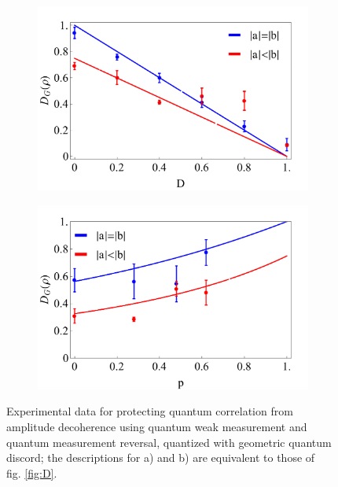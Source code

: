 \documentclass[%
 reprint,
 amsmath,amssymb,
 aps,
]{revtex4-1}
\begin{document}
\begin{figure}
        \centering
        \begin{subfigure}[b]{0.49\textwidth}
                \includegraphics[width=\textwidth]{DGD}
                \caption{}
                \label{fig:DGD}
        \end{subfigure}
        \vfill
        \begin{subfigure}[b]{0.49\textwidth}
                \includegraphics[width=\textwidth]{DGp}
                \caption{}
                \label{fig:DGp}
        \end{subfigure}
        \caption{Experimental data for protecting quantum correlation from amplitude decoherence using quantum weak measurement and quantum measurement reversal, quantized with geometric quantum discord; the descriptions for a) and b) are equivalent to those of \\ fig. \ref{fig:D}.}\label{fig:DG}
\end{figure}
\end{document}
